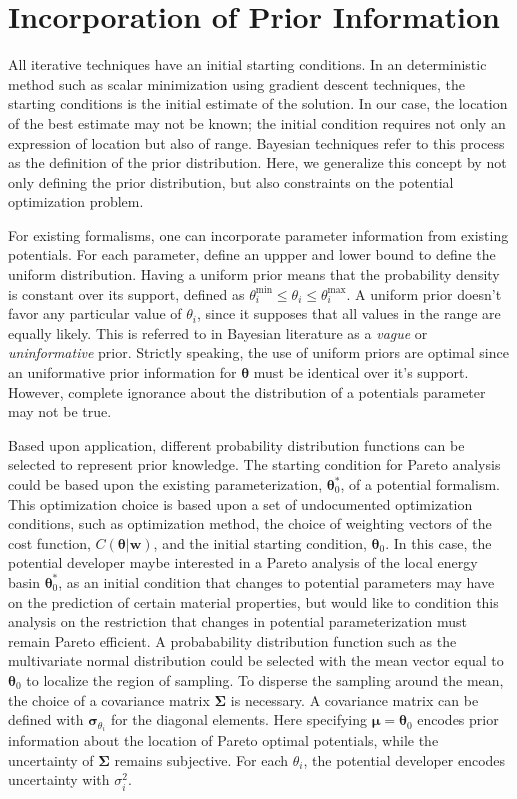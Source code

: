 \section{Incorporation of Prior Information}
\label{sec:prior_information}

All iterative techniques have an initial starting conditions.  In an deterministic method such as scalar minimization using gradient descent techniques, the starting conditions is the initial estimate of the solution.  In our case, the location of the best estimate may not be known; the initial condition requires not only an expression of location but also of range.  Bayesian techniques refer to this process as the definition of the prior distribution.  Here, we generalize this concept by not only defining the prior distribution, but also constraints on the potential optimization problem.

For existing formalisms, one can incorporate parameter information from existing potentials.  For each parameter, define an uppper and lower bound to define the uniform distribution.  Having a uniform prior means that the probability density is constant over its support, defined as $\theta_{i}^{\text{min}} \leq \theta_i \leq \theta_{i}^{\text{max}}.$  A uniform prior doesn't favor any particular value of $\theta_i$, since it supposes that all values in the range are equally likely.  This is referred to in Bayesian literature as a \emph{vague} or \emph{uninformative} prior.  Strictly speaking, the use of uniform priors are optimal since an uniformative prior information for $\bm{\theta}$ must be identical over it's support.    However, complete ignorance about the distribution of a potentials parameter may not be true.

Based upon application, different probability distribution functions can be selected to represent prior knowledge.  The starting condition for Pareto analysis could be based upon the existing parameterization, $\bm{\theta}_0^*$, of a potential formalism.  This optimization choice is based upon a set of undocumented optimization conditions, such as optimization method, the choice of weighting vectors of the cost function, $C(\bm{\theta}|\bm{w})$, and the initial starting condition, $\bm{\theta}_0$.  In this case, the potential developer maybe interested in a Pareto analysis of the local energy basin $\bm{\theta}_0^*$, as an initial condition that changes to potential parameters may have on the prediction of certain material properties, but would like to condition this analysis on the restriction that changes in potential parameterization must remain Pareto efficient.  A probabability distribution function such as the multivariate normal distribution could be selected with the mean vector equal to $\bm{\theta}_0$ to localize the region of sampling.  To disperse the sampling around the mean, the choice of a covariance matrix $\bm{\Sigma}$ is necessary.  A covariance matrix can be defined with $\bm{\sigma}_{\theta_i}$ for the diagonal elements.
Here specifying $\bm{\mu} = \bm{\theta}_0$ encodes prior information about the location of Pareto optimal potentials, while the uncertainty of $\bm{\Sigma}$ remains subjective.  For each $\theta_i$, the potential developer encodes uncertainty with $\sigma_i^2$.

